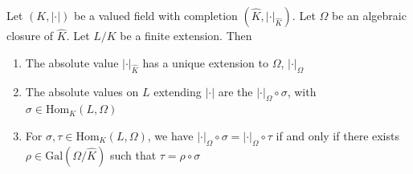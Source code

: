 \begin{corollary}{}
    Let \({(K, |\cdot |)}\) be a valued field with completion \({(\widehat{K},
    |\cdot |_{\widehat{K}} )}\). Let \(\Omega\) be an algebraic closure of
    \(\widehat{K}\). Let \(L / K\) be a finite extension. Then
\begin{enumerate}[label = \arabic*.]
    \item The absolute value \(|\cdot |_{\widehat{K}}\) has a unique extension
        to \(\Omega\), \(|\cdot|_{\Omega} \) 
    \item The absolute values on \(L\) extending \(|\cdot |\) are the \(|\cdot
        |_\Omega \circ \sigma\), with \(\sigma \in  \mathrm{Hom}_K {(L, \Omega)}\) 
    \item For \(\sigma, \tau \in \mathrm{Hom}_K{(L, \Omega)}\), we have \(|\cdot
        |_\Omega \circ \sigma = |\cdot |_\Omega \circ \tau\) if and only if
        there exists \(\rho \in \mathrm{Gal}{( \Omega / \widehat{K})}\) such
        that \(\tau = \rho \circ \sigma\) 
\end{enumerate}
\end{corollary}
